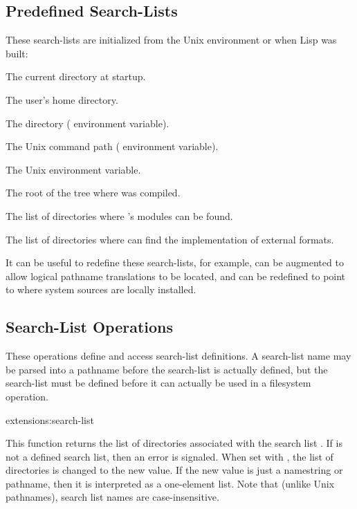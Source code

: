 \subsection{Predefined Search-Lists}

These search-lists are initialized from the Unix environment or when Lisp was
built:
\begin{Lentry}
\item[\code{default:}] The current directory at startup.

\item[\code{home:}] The user's home directory.

\item[\code{library:}] The \cmucl{}  directory ( environment
variable).

\item[\code{path:}] The Unix command path ( environment variable).
\item[\code{ld-library-path:}] The Unix 
  environment variable.
\item[\code{target:}] The root of the tree where \cmucl{} was compiled.
\item[\code{modules:}] The list of directories where \cmucl{}'s
  modules can be found.
\item[\code{ext-formats:}] The list of directories where \cmucl{} can
  find the implementation of external formats.  
\end{Lentry}
It can be useful to redefine these search-lists, for example, 
can be augmented to allow logical pathname translations to be located, and
 can be redefined to point to where \cmucl{} system sources are
locally installed. 


\subsection{Search-List Operations}

These operations define and access search-list definitions.  A search-list name
may be parsed into a pathname before the search-list is actually defined, but
the search-list must be defined before it can actually be used in a filesystem
operation.

\begin{defun}{extensions:}{search-list}{}
  
  This function returns the list of directories associated with the
  search list .  If  is not a defined search list,
  then an error is signaled.  When set with , the list of
  directories is changed to the new value.  If the new value is just a
  namestring or pathname, then it is interpreted as a one-element
  list.  Note that (unlike Unix pathnames), search list names are
  case-insensitive.
\end{defun}


